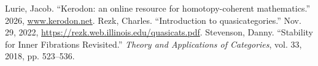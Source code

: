 \documentclass{tac}
\begin{document}
\begin{references*}
 Lurie, Jacob. ``Kerodon: an online resource for homotopy-coherent mathematics.” 2026, \url{www.kerodon.net}. 
 Rezk, Charles. ``Introduction to quasicategories.'' Nov. 29, 2022, \url{https://rezk.web.illinois.edu/quasicats.pdf}.
 Stevenson, Danny. ``Stability for Inner Fibrations Revisited.” \emph{Theory and Applications of Categories}, vol. 33, 2018, pp. 523–536.
\end{references*}
\end{document}
